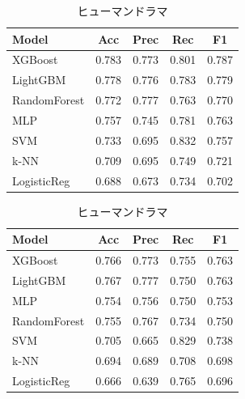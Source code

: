 \documentclass[uplatex, dvipdfmx, 11pt, a4paper, report]{jsbook}
\begin{document}
\begin{table}[H]
  \small
  \begin{minipage}[t]{0.49\textwidth}
    \centering
    \caption{純文学}
    \begin{tabular}{l|c|c|c|c} \hline
      Model & Acc & Prec & Rec & F1 \\ \hline
      XGBoost & 0.783 & 0.773 & 0.801 & 0.787 \\
      LightGBM & 0.778 & 0.776 & 0.783 & 0.779 \\
      RandomForest & 0.772 & 0.777 & 0.763 & 0.770 \\
      MLP & 0.757 & 0.745 & 0.781 & 0.763 \\
      SVM & 0.733 & 0.695 & 0.832 & 0.757 \\
      k-NN & 0.709 & 0.695 & 0.749 & 0.721 \\
      LogisticReg & 0.688 & 0.673 & 0.734 & 0.702 \\ \hline
    \end{tabular}
  \end{minipage}
  \hfill
  \begin{minipage}[t]{0.49\textwidth}
    \centering
    \caption{ヒューマンドラマ}
    \begin{tabular}{l|c|c|c|c} \hline
      Model & Acc & Prec & Rec & F1 \\ \hline
      XGBoost & 0.766 & 0.773 & 0.755 & 0.763 \\
      LightGBM & 0.767 & 0.777 & 0.750 & 0.763 \\
      MLP & 0.754 & 0.756 & 0.750 & 0.753 \\
      RandomForest & 0.755 & 0.767 & 0.734 & 0.750 \\
      SVM & 0.705 & 0.665 & 0.829 & 0.738 \\
      k-NN & 0.694 & 0.689 & 0.708 & 0.698 \\
      LogisticReg & 0.666 & 0.639 & 0.765 & 0.696 \\ \hline
    \end{tabular}
  \end{minipage}
\end{table}
\end{document}
